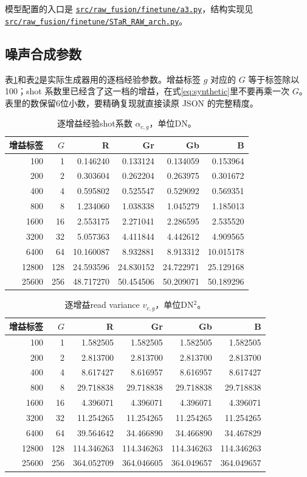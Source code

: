 \documentclass[11pt,a4paper,UTF8,fontset=fandol]{ctexart}
\newcommand{\repofile}[1]{\href{https://github.com/JingZe-Liang/SigmaStar_AIISP/blob/main/Stage2/9_19-10_1/Task3/XWJ/RECOVERED_Stage2_DenoiseModel_20261010/#1}{\nolinkurl{#1}}}
\begin{document}
模型配置的入口是 \repofile{src/raw_fusion/finetune/a3.py}，结构实现见 \repofile{src/raw_fusion/finetune/STaR_RAW_arch.py}。

\subsection{噪声合成参数}

表\ref{tab:shot}和表\ref{tab:read}是实际生成器用的逐档经验参数。增益标签 $g$ 对应的 $G$ 等于标签除以100；shot 系数里已经含了这一档的增益，在式\eqref{eq:synthetic}里不要再乘一次 $G$。表里的数保留6位小数，要精确复现就直接读原 JSON 的完整精度。

\begin{table}[!htbp]
\centering\small
\caption{逐增益经验shot系数 $\alpha_{c,g}$，单位DN。}
\label{tab:shot}
\begin{tabular}{rrrrrr}
\toprule
增益标签 & $G$ & R & Gr & Gb & B \\
\midrule
100 & 1 & 0.146240 & 0.133124 & 0.134059 & 0.153964 \\
200 & 2 & 0.303604 & 0.262204 & 0.263975 & 0.301672 \\
400 & 4 & 0.595802 & 0.525547 & 0.529092 & 0.569351 \\
800 & 8 & 1.234060 & 1.038338 & 1.045279 & 1.185013 \\
1600 & 16 & 2.553175 & 2.271041 & 2.286595 & 2.535520 \\
3200 & 32 & 5.057363 & 4.411844 & 4.442612 & 4.909565 \\
6400 & 64 & 10.160087 & 8.932881 & 8.913312 & 10.015178 \\
12800 & 128 & 24.593596 & 24.830152 & 24.722971 & 25.129168 \\
25600 & 256 & 48.717270 & 50.454506 & 50.209071 & 50.189296 \\
\bottomrule
\end{tabular}
\end{table}

\begin{table}[!htbp]
\centering\small
\caption{逐增益read variance $v_{c,g}$，单位DN$^2$。}
\label{tab:read}
\begin{tabular}{rrrrrr}
\toprule
增益标签 & $G$ & R & Gr & Gb & B \\
\midrule
100 & 1 & 1.582505 & 1.582505 & 1.582505 & 1.582505 \\
200 & 2 & 2.813700 & 2.813700 & 2.813700 & 2.813700 \\
400 & 4 & 8.617427 & 8.616957 & 8.616957 & 8.617427 \\
800 & 8 & 29.718838 & 29.718838 & 29.718838 & 29.718838 \\
1600 & 16 & 4.396071 & 4.396071 & 4.396071 & 4.396071 \\
3200 & 32 & 11.254265 & 11.254265 & 11.254265 & 11.254265 \\
6400 & 64 & 39.564642 & 34.466890 & 34.466890 & 34.467829 \\
12800 & 128 & 114.346263 & 114.346263 & 114.346263 & 114.346263 \\
25600 & 256 & 364.052709 & 364.046605 & 364.049657 & 364.049657 \\
\bottomrule
\end{tabular}
\end{table}
\end{document}
